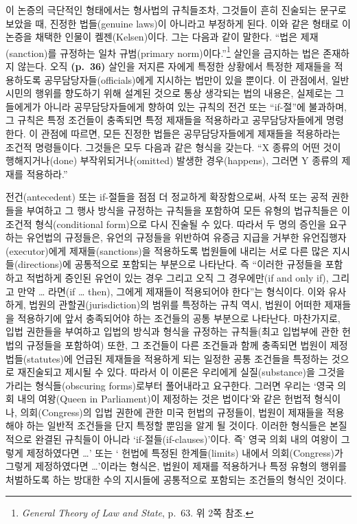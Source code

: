 이 논증의 극단적인 형태에서는 형사법의 규칙들조차, 그것들이 흔히
진술되는 문구로 보았을 때, 진정한 법들(genuine laws)이 아니라고 부정하게
된다. 이와 같은 형태로 이 논증을 채택한 인물이 켈젠(Kelsen)이다. 그는
다음과 같이 말한다. “법은 제재(sanction)를 규정하는 일차 규범(primary
norm)이다.”\footnote{\emph{General Theory of Law and State}, p.~63. 위
  2쪽 참조.} 살인을 금지하는 법은 존재하지 않는다. 오직 \textbf{(p.~36)}
살인을 저지른 자에게 특정한 상황에서 특정한 제재들을 적용하도록
공무담당자들(officials)에게 지시하는 법만이 있을 뿐이다. 이 관점에서,
일반 시민의 행위를 향도하기 위해 설계된 것으로 통상 생각되는 법의
내용은, 실제로는 그들에게가 아니라 공무담당자들에게 향하여 있는 규칙의
전건 또는 “if-절”에 불과하며, 그 규칙은 특정 조건들이 충족되면 특정
제재들을 적용하라고 공무담당자들에게 명령한다. 이 관점에 따르면, 모든
진정한 법들은 공무담당자들에게 제재들을 적용하라는 조건적 명령들이다.
그것들은 모두 다음과 같은 형식을 갖는다. “X 종류의 어떤 것이
행해지거나(done) 부작위되거나(omitted) 발생한 경우(happens), 그러면 Y
종류의 제재를 적용하라.”

전건(antecedent) 또는 if-절들을 점점 더 정교하게 확장함으로써, 사적 또는
공적 권한들을 부여하고 그 행사 방식을 규정하는 규칙들을 포함하여 모든
유형의 법규칙들은 이 조건적 형식(conditional form)으로 다시 진술될 수
있다. 따라서 두 명의 증인을 요구하는 유언법의 규정들은, 유언의 규정들을
위반하여 유증금 지급을 거부한 유언집행자(executor)에게
제재들(sanctions)을 적용하도록 법원들에 내리는 서로 다른 많은
지시들(directions)에 공통적으로 포함되는 부분으로 나타난다. 즉 “이러한
규정들을 포함하고 적법하게 증인된 유언이 있는 경우 그리고 오직 그
경우에만(if and only if), 그리고 만약 \ldots{} 라면(if \ldots{} then),
그에게 제재들이 적용되어야 한다”는 형식이다. 이와 유사하게, 법원의
관할권(jurisdiction)의 범위를 특정하는 규칙 역시, 법원이 어떠한 제재들을
적용하기에 앞서 충족되어야 하는 조건들의 공통 부분으로 나타난다.
마찬가지로, 입법 권한들을 부여하고 입법의 방식과 형식을 규정하는
규칙들(최고 입법부에 관한 헌법의 규정들을 포함하여) 또한, 그 조건들이
다른 조건들과 함께 충족되면 법원이 제정법들(statutes)에 언급된 제재들을
적용하게 되는 일정한 공통 조건들을 특정하는 것으로 재진술되고 제시될 수
있다. 따라서 이 이론은 우리에게 실질(substance)을 그것을 가리는
형식들(obscuring forms)로부터 풀어내라고 요구한다. 그러면 우리는 ‘영국
의회 내의 여왕(Queen in Parliament)이 제정하는 것은 법이다’와 같은
헌법적 형식이나, 의회(Congress)의 입법 권한에 관한 미국 헌법의 규정들이,
법원이 제재들을 적용해야 하는 일반적 조건들을 단지 특정할 뿐임을 알게 될
것이다. 이러한 형식들은 본질적으로 완결된 규칙들이 아니라
‘if-절들(if-clauses)’이다. 즉' 영국 의회 내의 여왕이
그렇게 제정하였다면 \ldots' 또는 ‘ 헌법에 특정된
한계들(limits) 내에서 의회(Congress)가 그렇게 제정하였다면 \ldots’이라는
형식은, 법원이 제재를 적용하거나 특정 유형의 행위를 처벌하도록 하는
방대한 수의 지시들에 공통적으로 포함되는 조건들의 형식인 것이다.

